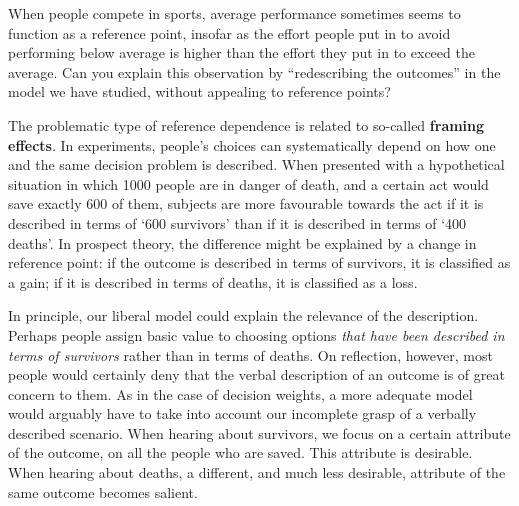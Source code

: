 \begin{exercise}{1}
  When people compete in sports, average performance sometimes seems to function
  as a reference point, insofar as the effort people put in to avoid performing
  below average is higher than the effort they put in to exceed the average.%
  Can you explain this observation by ``redescribing the outcomes'' in the model
  we have studied, without appealing to reference points?
\end{exercise}


The problematic type of reference dependence is related to so-called
\textbf{framing effects}. In experiments, people's choices can systematically
depend on how one and the same decision problem is described. When presented
with a hypothetical situation in which 1000 people are in danger of death, and a
certain act would save exactly 600 of them, subjects are more favourable towards
the act if it is described in terms of `600 survivors' than if it is described
in terms of `400 deaths'. In prospect theory, the difference might be explained
by a change in reference point: if the outcome is described in terms of
survivors, it is classified as a gain; if it is described in terms of deaths, it
is classified as a loss.

In principle, our liberal model could explain the relevance of the description.
Perhaps people assign basic value to choosing options \emph{that have been
  described in terms of survivors} rather than in terms of deaths. On
reflection, however, most people would certainly deny that the verbal
description of an outcome is of great concern to them. As in the case of
decision weights, a more adequate model would arguably have to take into account
our incomplete grasp of a verbally described scenario. When hearing about
survivors, we focus on a certain attribute of the outcome, on all the people who
are saved. This attribute is desirable. When hearing about deaths, a different,
and much less desirable, attribute of the same outcome becomes salient.

